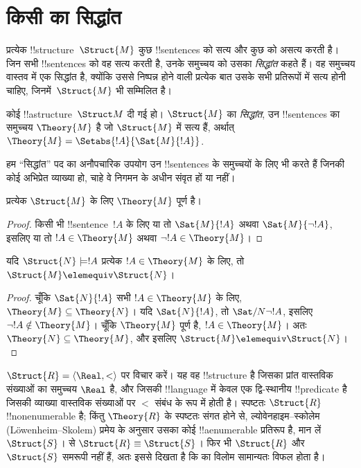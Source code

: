 \documentclass[../../../include/open-logic-section]{subfiles}
\begin{document}

\section{किसी  का सिद्धांत}

प्रत्येक !!{structure}~$\Struct{M}$ कुछ !!{sentence}s को सत्य और कुछ को
असत्य करती है। जिन सभी !!{sentence}s को वह सत्य करती है, उनके समुच्चय को
उसका \emph{सिद्धांत} कहते हैं। वह समुच्चय वास्तव में एक सिद्धांत है,
क्योंकि उससे निष्पन्न होने वाली प्रत्येक बात उसके सभी प्रतिरूपों में सत्य होनी
चाहिए, जिनमें~$\Struct{M}$ भी सम्मिलित है।

\begin{defn}
  कोई !!a{structure}~$\Struct M$ दी गई हो। $\Struct{M}$ का
  \emph{सिद्धांत}, उन !!{sentence}s का समुच्चय $\Theory{M}$ है जो
  $\Struct{M}$ में सत्य हैं, अर्थात् $\Theory{M} =
  \Setabs{!A}{\Sat{M}{!A}}$.
\end{defn}

हम ``सिद्धांत'' पद का अनौपचारिक उपयोग उन !!{sentence}s के समुच्चयों के लिए
भी करते हैं जिनकी कोई अभिप्रेत व्याख्या हो, चाहे वे निगमन के अधीन संवृत हों या
नहीं।

\begin{prop}
प्रत्येक $\Struct{M}$ के लिए $\Theory{M}$ पूर्ण है।
\end{prop}

\begin{proof}
किसी भी !!{sentence}~$!A$ के लिए या तो $\Sat{M}{!A}$ अथवा
$\Sat{M}{\lnot !A}$, इसलिए या तो $!A \in \Theory{M}$ अथवा
$\lnot !A \in \Theory{M}$।
\end{proof}

\begin{prop}
  यदि $\Struct{N} \models !A$ प्रत्येक $!A \in \Theory{M}$ के लिए, तो
  $\Struct{M} \elemequiv \Struct{N}$।
\end{prop}

\begin{proof}
चूँकि $\Sat{N}{!A}$ सभी $!A \in \Theory{M}$ के लिए, $\Theory{M} \subseteq
\Theory{N}$। यदि $\Sat{N}{!A}$, तो $\Sat/{N}{\lnot !A}$, इसलिए $\lnot !A
\notin \Theory{M}$। चूँकि $\Theory{M}$ पूर्ण है, $!A \in
\Theory{M}$। अतः $\Theory{N} \subseteq \Theory{M}$, और इसलिए
$\Struct{M} \elemequiv \Struct{N}$।
\end{proof}

\begin{rem}
  $\Struct{R} = \langle\Real, <\rangle$ पर विचार करें। यह वह
  !!{structure} है जिसका प्रांत वास्तविक संख्याओं का समुच्चय $\Real$ है,
  और जिसकी !!{language} में केवल एक द्वि-स्थानीय !!{predicate} है जिसकी
  व्याख्या वास्तविक संख्याओं पर $<$ संबंध के रूप में होती है। स्पष्टतः
  $\Struct{R}$ !!{nonenumerable} है; किंतु $\Theory{R}$ के स्पष्टतः संगत
  होने से, ल्योवेनहाइम--स्कोलेम (L\"owenheim--Skolem) प्रमेय के अनुसार उसका
  कोई !!a{enumerable} प्रतिरूप है, मान लें $\Struct{S}$।
   से $\Struct{R}
  \equiv \Struct{S}$। फिर भी $\Struct{R}$ और $\Struct{S}$ समरूपी नहीं हैं,
  अतः इससे दिखता है कि  का विलोम सामान्यतः विफल होता
  है।
\end{rem}
\end{document}
